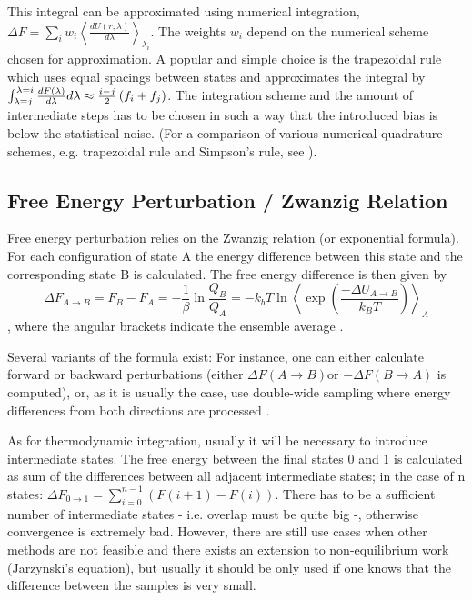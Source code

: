 This integral can be approximated using numerical integration, $\Delta F=\sum_{i}w_{i}\left\langle \frac{dU\left(r,\lambda\right)}{d\lambda}\right\rangle _{\lambda_{i}}$.
The weights $w_{i}$ depend on the numerical scheme chosen for approximation.
A popular and simple choice is the trapezoidal rule which uses equal
spacings between states and approximates the integral by $\intop_{\lambda=j}^{\lambda=i}\frac{dF\left(\lambda\right)}{d\lambda}d\lambda\approx\frac{i-j}{2}\left(f_{i}+f_{j}\right)$.
The integration scheme and the amount of intermediate steps has to
be chosen in such a way that the introduced bias is below the statistical
noise\cite{Shirts.2013}. (For a comparison of various numerical quadrature
schemes, e.g. trapezoidal rule and Simpson's rule, see \cite{Bruckner.2011b}). 

\subsection{Free Energy Perturbation / Zwanzig Relation}

Free energy perturbation relies on the Zwanzig relation (or exponential
formula). For each configuration of state A the energy difference
between this state and the corresponding state B is calculated. The
free energy difference is then given by 
\[
\Delta F_{A\rightarrow B}=F_{B}-F_{A}=-\frac{1}{\beta}\ln\frac{Q_{B}}{Q_{A}}=-k_{b}T\ln\left\langle \exp\left(\frac{-\Delta U_{A\rightarrow B}}{k_{B}T}\right)\right\rangle _{A}
\]
, where the angular brackets indicate the ensemble average \cite{Gapsys.2015}. 

Several variants of the formula exist: For instance, one can either
calculate forward or backward perturbations (either $\Delta F\left(A\rightarrow B\right)$or
$-\Delta F\left(B\rightarrow A\right)$ is computed), or, as it is
usually the case, use double-wide sampling where energy differences
from both directions are processed \cite{Bruckner.2011}.

As for thermodynamic integration, usually it will be necessary to
introduce intermediate states. The free energy between the final states
0 and 1 is calculated as sum of the differences between all adjacent
intermediate states; in the case of n states: $\Delta F_{0\rightarrow1}=\sum_{i=0}^{n-1}\left(F\left(i+1\right)-F\left(i\right)\right)$.
There has to be a sufficient number of intermediate states - i.e.
overlap must be quite big -, otherwise convergence is extremely bad.
However, there are still use cases when other methods are not feasible\cite{Boresch.2017}
and there exists an extension to non-equilibrium work (Jarzynski's
equation)\cite{Boresch.2017}, but usually it should be only used
if one knows that the difference between the samples is very small\cite{Shirts.2013}.

